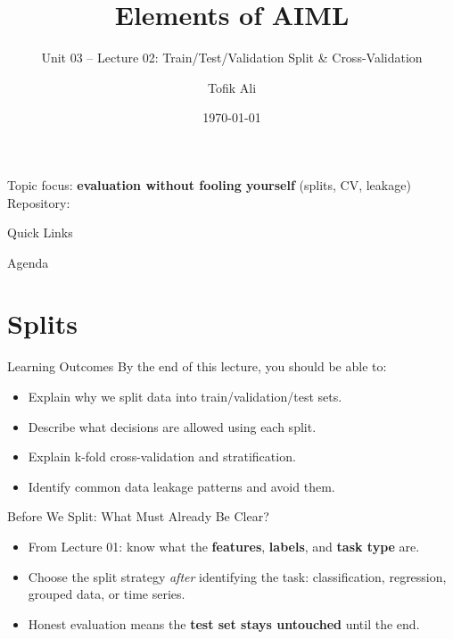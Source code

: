 \documentclass[aspectratio=169]{beamer}
\title[Elements of AIML]{Elements of AIML}
\subtitle{Unit 03 -- Lecture 02: Train/Test/Validation Split \& Cross-Validation}
\author{Tofik Ali}
\institute{School of Computer Science, UPES Dehradun}
\date{\today}
\begin{document}
\UPESCoverFrame
\setcounter{framenumber}{0}

\begin{frame}
  \titlepage
  \vspace{0.3em}
  \begin{center}
    \footnotesize Topic focus: \textbf{evaluation without fooling yourself} (splits, CV, leakage)\\[0.25em]
    \footnotesize Repository: \texttt{\AIMLRepoURL}
  \end{center}
  \slidesources{\AIMLUnitIIISources}
\end{frame}

\begin{frame}{Quick Links}
  \centering
  \hyperlink{sec:splits}{}\hspace{0.6em}
  \hyperlink{sec:cv}{}\hspace{0.6em}
  \hyperlink{sec:leak}{}\hspace{0.6em}
  \hyperlink{sec:code}{}\hspace{0.6em}
  \hyperlink{sec:summary}{}
\end{frame}

\begin{frame}{Agenda}
  \tableofcontents
\end{frame}

\section{Splits}
\label{sec:splits}

\begin{frame}{Learning Outcomes}
  By the end of this lecture, you should be able to:
  \begin{itemize}[<+->]
    \item Explain why we split data into train/validation/test sets.
    \item Describe what decisions are allowed using each split.
    \item Explain k-fold cross-validation and stratification.
    \item Identify common data leakage patterns and avoid them.
  \end{itemize}
\end{frame}

\begin{frame}{Before We Split: What Must Already Be Clear?}
  \begin{itemize}[<+->]
    \item From Lecture 01: know what the \textbf{features}, \textbf{labels}, and \textbf{task type} are.
    \item Choose the split strategy \emph{after} identifying the task: classification, regression, grouped data, or time series.
    \item Honest evaluation means the \textbf{test set stays untouched} until the end.
  \end{itemize}
\end{frame}
\end{document}
